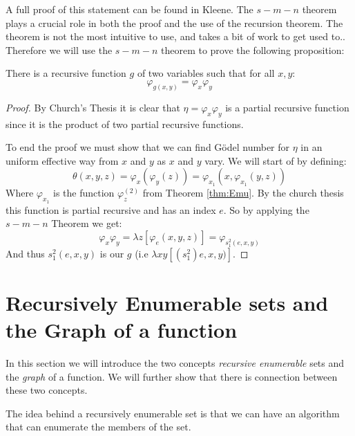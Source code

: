\documentclass[../main.tex]{subfiles}
\begin{document}
A full proof of this statement can be found in Kleene. The $s-m-n$ theorem
plays a crucial role in both the proof and the use of the recursion theorem.
The theorem is not the most intuitive to use, and takes a bit of work to get
used to.. Therefore we will use the $s-m-n$ theorem to
prove the following proposition:
\begin{prop}
	There is a recursive function $g$ of two variables such that for all
	$x,y$:
\[\varphi_{g(x,y)}=\varphi_x\varphi_y\]
\end{prop}
\begin{proof}
	By Church's Thesis it is clear that $\eta=\varphi_x\varphi_y$ is a
	partial recursive function since it is the product of two partial
	recursive functions.

	To end the proof we must show that we can find Gödel number for $\eta$
	in an uniform effective way from $x$ and $y$ as $x$ and $y$ vary. We
	will start of by defining:
	\[\theta(x,y,z)=\varphi_x(\varphi_y(z))=\varphi_{x_1}(x,\varphi_{x_1}(y,z))\]
	Where $\varphi_{x_1}$ is the function $\varphi_z^{(2)}$ from Theorem
	\ref{thm:Emu}. By the church thesis this function is partial recursive
	and has an index $e$. So by applying the $s-m-n$ Theorem we get:
	\[\varphi_x\varphi_y=\lambda
	z[\varphi_e(x,y,z)]=\varphi_{s_1^2(e,x,y)}\]
	And thus $s_1^2(e,x,y)$ is our $g$ (i.e $\lambda xy[(s_1^2)e,x,y)]$.
\end{proof}

\section{Recursively Enumerable sets and the Graph of a function}
In this section we will introduce the two concepts \textit{recursive
enumerable} sets and the \textit{graph} of a function. We will further show
that there is connection between these two concepts.

The idea behind a recursively enumerable set is that we can have an algorithm
that can enumerate the members of the set.
\end{document}
